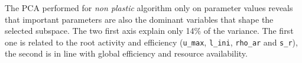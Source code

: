 
\begin{figure}%
    \classiccaptionstyle
{}
\end{figure}

The PCA performed for \textit{non plastic} algorithm only on parameter values reveals that important parameters are also the dominant variables that shape the selected subspace. The two first axis explain only 14\% of the variance. The first one is related to the root activity and efficiency (\texttt{u\_max}, \texttt{l\_ini}, \texttt{rho\_ar} and \texttt{s\_r}), the second is in line with global efficiency and resource availability.

